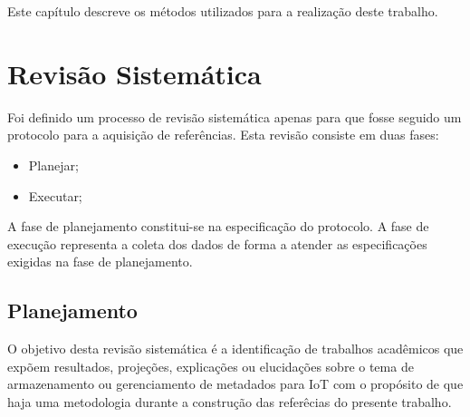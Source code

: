 \newcommand{\texCommand}[1]{\texttt{\textbackslash{#1}}}%

\newcommand{\exemplo}[1]{%
\vspace{\baselineskip}%
\noindent\fbox{\begin{minipage}{\textwidth}#1\end{minipage}}%
\\\vspace{\baselineskip}}%

\newcommand{\exemploVerbatim}[1]{%
\vspace{\baselineskip}%
\noindent\fbox{\begin{minipage}{\textwidth}%
#1\end{minipage}}%
\\\vspace{\baselineskip}}%


\quad Este capítulo descreve os métodos utilizados para a realização deste trabalho.

\section{Revisão Sistemática}
\quad Foi definido um processo de revisão sistemática apenas para que fosse seguido um protocolo para a aquisição de referências. Esta revisão consiste em duas fases:
\begin{itemize}
  \item Planejar;
  \item Executar;
\end{itemize}
\quad A fase de planejamento constitui-se na especificação do protocolo.
A fase de execução representa a coleta dos dados de forma a atender as especificações
exigidas na fase de planejamento.

\subsection{Planejamento}
\quad O objetivo desta revisão sistemática é a identificação de trabalhos acadêmicos
que expõem resultados, projeções, explicações ou elucidações sobre o tema de armazenamento ou gerenciamento
de metadados para \acrlong{IoT} com o propósito de que haja uma metodologia durante a
construção das referêcias do presente trabalho.

